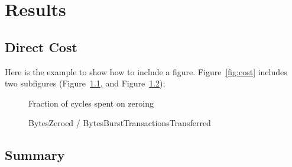 \chapter{Results}
\label{cha:result}

\section{Direct Cost}
\label{sec:direct_cost}

Here is the example to show how to include a
figure. Figure~\ref{fig:cost} includes two subfigures
(Figure~\ref{fig:zerocost}, and Figure~\ref{fig:zerobus});

\begin{figure*}
  \begin{subfigure}[b]{\textwidth}
      \centering
      \caption{Fraction of cycles spent on zeroing}
      \label{fig:zerocost}
  \end{subfigure}

  \begin{subfigure}[b]{\textwidth}
      \centering
      \caption{BytesZeroed / BytesBurstTransactionsTransferred}
      \label{fig:zerobus}
  \end{subfigure}
  \caption{The cost of zero initialization}
  \label{fig:cost}
\end{figure*}



\section{Summary}
